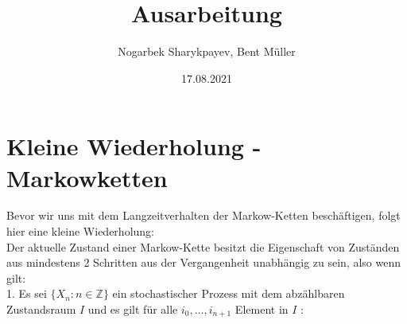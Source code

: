 \documentclass[a4paper]{article}
\begin{document}
\title{ \textbf{Ausarbeitung} }
\author{Nogarbek Sharykpayev, Bent Müller}
\date{17.08.2021}
\maketitle
\pagebreak
\tableofcontents
\pagebreak

\section{Kleine Wiederholung - Markowketten}

Bevor wir uns mit dem Langzeitverhalten der Markow-Ketten beschäftigen, folgt hier eine kleine Wiederholung:
\\

Der aktuelle Zustand einer Markow-Kette besitzt die Eigenschaft von Zuständen aus mindestens 2 Schritten aus der Vergangenheit unabhängig zu sein, also wenn gilt:
\\

1. Es sei $\{X_n : n \in \mathbb{Z} \}$ ein stochastischer Prozess mit dem abzählbaren Zustandsraum $I$ und es gilt für alle $i_0, …, i_{n+1}$ Element in $I$ : 
\end{document}
